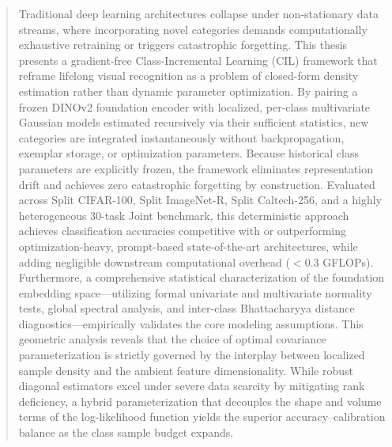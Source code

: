 \begin{abstract}
	Traditional deep learning architectures collapse under non-stationary data streams, where incorporating novel categories demands computationally exhaustive retraining or triggers catastrophic forgetting. This thesis presents a gradient-free Class-Incremental Learning (CIL) framework that reframe lifelong visual recognition as a problem of closed-form density estimation rather than dynamic parameter optimization. By pairing a frozen DINOv2 foundation encoder with localized, per-class multivariate Gaussian models estimated recursively via their sufficient statistics, new categories are integrated instantaneously without backpropagation, exemplar storage, or optimization parameters. Because historical class parameters are explicitly frozen, the framework eliminates representation drift and achieves zero catastrophic forgetting by construction. Evaluated across Split CIFAR-100, Split ImageNet-R, Split Caltech-256, and a highly heterogeneous 30-task Joint benchmark, this deterministic approach achieves classification accuracies competitive with or outperforming optimization-heavy, prompt-based state-of-the-art architectures, while adding negligible downstream computational overhead ($<0.3$ GFLOPs). Furthermore, a comprehensive statistical characterization of the foundation embedding space---utilizing formal univariate and multivariate normality tests, global spectral analysis, and inter-class Bhattacharyya distance diagnostics---empirically validates the core modeling assumptions. This geometric analysis reveals that the choice of optimal covariance parameterization is strictly governed by the interplay between localized sample density and the ambient feature dimensionality. While robust diagonal estimators excel under severe data scarcity by mitigating rank deficiency, a hybrid parameterization that decouples the shape and volume terms of the log-likelihood function yields the superior accuracy--calibration balance as the class sample budget expands.
\end{abstract}

